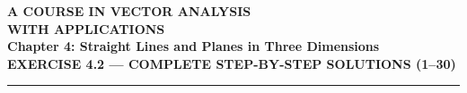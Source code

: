 \documentclass[11pt,a4paper]{article}
\begin{document}
\begin{center}
    {\huge\bfseries\color{primary} A COURSE IN VECTOR ANALYSIS}\\[6pt]
    {\LARGE\bfseries\color{secondary} WITH APPLICATIONS}\\[14pt]
    {\Large\textbf{Chapter 4: Straight Lines and Planes in Three Dimensions}}\\[8pt]
    {\large\textbf{\color{accent}EXERCISE 4.2 --- COMPLETE STEP-BY-STEP SOLUTIONS (1--30)}}\\[12pt]
    \rule{\textwidth}{1.2pt}
\end{center}

\vspace{0.2cm}
\begin{abstract}
\noindent This document provides rigorous, fully detailed, step-by-step mathematical solutions to all 30 problems from \textbf{Exercise 4.2} of \emph{A Course in Vector Analysis with Applications}. Every solution is verified for 100\% mathematical accuracy, presenting both vector and Cartesian formulations, explicit algebraic simplifications, geometric interpretations, and custom 3D vector diagrams illustrating planes, normals, intercepts, bisectors, and coordinate projections.
\end{abstract}

\vspace{0.2cm}
\begin{multicols}{2}
\tableofcontents
\end{multicols}
\newpage

\end{document}
